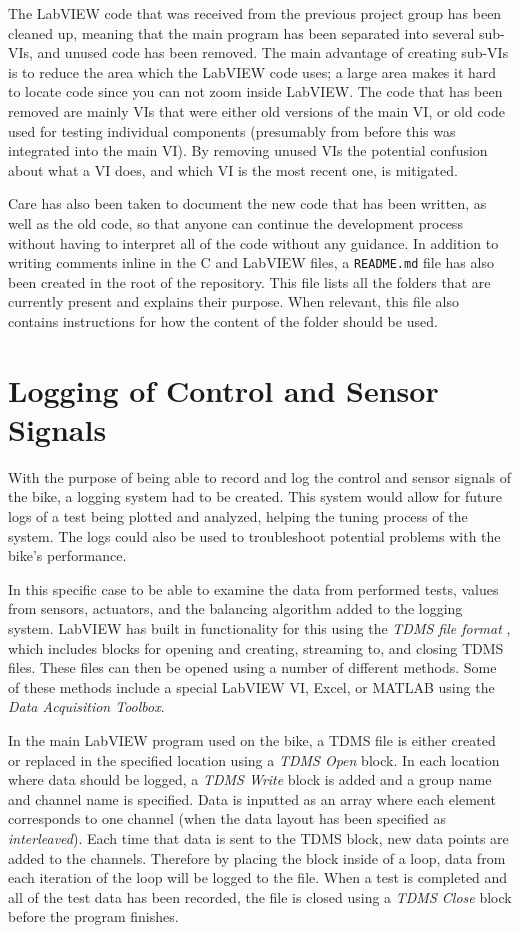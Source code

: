 The LabVIEW code that was received from the previous project group has been cleaned up, meaning that the main program has been separated into several sub-VIs, and unused code has been removed. The main advantage of creating sub-VIs is to reduce the area which the LabVIEW code uses; a large area makes it hard to locate code since you can not zoom inside LabVIEW. The code that has been removed are mainly VIs that were either old versions of the main VI, or old code used for testing individual components (presumably from before this was integrated into the main VI). By removing unused VIs the potential confusion about what a VI does, and which VI is the most recent one, is mitigated.

Care has also been taken to document the new code that has been written, as well as the old code, so that anyone can continue the development process without having to interpret all of the code without any guidance. In addition to writing comments inline in the C and LabVIEW files, a \texttt{README.md} file has also been created in the root of the repository. This file lists all the folders that are currently present and explains their purpose. When relevant, this file also contains instructions for how the content of the folder should be used.

\section{Logging of Control and Sensor Signals} \label{method:logging}

With the purpose of being able to record and log the control and sensor signals of the bike, a logging system had to be created. This system would allow for future logs of a test being plotted and analyzed, helping the tuning process of the system. The logs could also be used to troubleshoot potential problems with the bike's performance.

In this specific case to be able to examine the data from performed tests, values from sensors, actuators, and the balancing algorithm added to the logging system. LabVIEW has built in functionality for this using the \textit{TDMS file format} \cite{NationalInstruments2022TheFormat}, which includes blocks for opening and creating, streaming to, and closing TDMS files. These files can then be opened using a number of different methods. Some of these methods include a special LabVIEW VI, Excel, or MATLAB using the \textit{Data Acquisition Toolbox}. 

In the main LabVIEW program used on the bike, a TDMS file is either created or replaced in the specified location using a \textit{TDMS Open} block. In each location where data should be logged, a \textit{TDMS Write} block is added and a group name and channel name is specified. Data is inputted as an array where each element corresponds to one channel (when the data layout has been specified as \textit{interleaved}). Each time that data is sent to the TDMS block, new data points are added to the channels. Therefore by placing the block inside of a loop, data from each iteration of the loop will be logged to the file. When a test is completed and all of the test data has been recorded, the file is closed using a \textit{TDMS Close} block before the program finishes.

